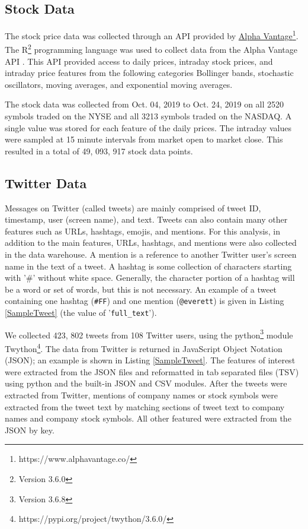 \documentclass[journal]{IEEEtran}
\begin{document}
\subsection{Stock Data}

The stock price data was collected through an API provided by
 \href{https://www.alphavantage.co/}{Alpha Vantage}\footnote{https://www.alphavantage.co/}.
The R\footnote{Version 3.6.0}
 programming language was used to collect data from the Alpha Vantage API
\cite{R}.
This API provided access to daily prices, intraday stock prices,
 and intraday price features from the following categories Bollinger bands, 
 stochastic oscillators, moving averages, and exponential moving averages. 

The stock data was collected from Oct. 04, 2019 to Oct. 24, 2019 on
 all 2520 symbols traded on the NYSE and all 3213 symbols traded on the NASDAQ.
A single value was stored for each feature of the daily prices.
The intraday values were sampled at 15 minute intervals from market open
 to market close.
This resulted in a total of 49, 093, 917 stock data points.


\subsection{Twitter Data}

Messages on Twitter (called tweets) are mainly comprised of
 tweet ID, timestamp, user (screen name), and text.
Tweets can also contain many other features such as
 URLs, hashtags, emojis,  and mentions.
For this analysis, in addition to the main features,
 URLs, hashtags, and mentions were also collected in the data warehouse.
A mention is a reference to another Twitter user's screen name
 in the text of a tweet.
A hashtag is some collection of characters starting with
 '\#' without white space.
Generally, the character portion of a hashtag will be a word or set of words,
 but this is not necessary.
An example of a tweet containing one hashtag (\texttt{\#FF}) and one 
mention (\texttt{@everett}) is given in Listing \ref{SampleTweet} (the value of
 '\texttt{full\_text}').

We collected 423, 802 tweets from 108 Twitter users, using the
 python\footnote{Version 3.6.8}
 module Twython\footnote{https://pypi.org/project/twython/3.6.0/}.
The data from Twitter is returned in JavaScript Object Notation (JSON); 
 an example is shown in Listing \ref{SampleTweet}.
The features of interest were extracted from the JSON files and reformatted in tab
 separated files (TSV) using python and the built-in JSON and CSV modules.
After the tweets were extracted from Twitter,
 mentions of company names or stock symbols were extracted from the tweet text by
 matching sections of tweet text to company names and company stock symbols.
All other featured were extracted from the JSON by key.
\end{document}
